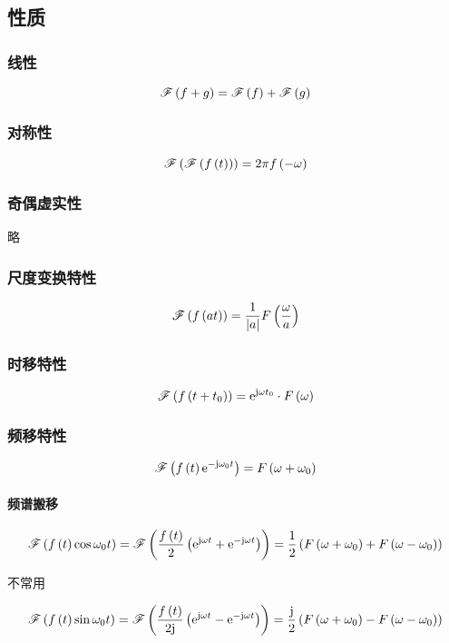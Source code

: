 \documentclass{article}
\begin{document}
\subsection{性质}

\subsubsection{线性}

\[\fourier{f+g}=\fourier f+\fourier g\]

\subsubsection{对称性}

\[\fourier{\fourier\ft}=2\pi f\pare{-\omega}\]

\subsubsection{奇偶虚实性}

略

\subsubsection{尺度变换特性}

\[\fourier{f\pare{at}}=\frac1{\abs a}F\pare{\frac\omega a}\]

\subsubsection{时移特性}

\[\fourier{f\pare{t+t_0}}=\e^{\j\omega t_0}\cdot F\pare{\omega}\]

\subsubsection{频移特性}

\[\fourier{\ft\e^{-\j\omega_0t}}=F\pare{\omega+\omega_0}\]

\paragraph{频谱搬移}

\[\fourier{\ft\cos\omega_0t}
    =\fourier{\frac\ft2\pare{\e^{\j\omega t}+\e^{-\j\omega t}}}
    =\frac12\pare{F\pare{\omega+\omega_0}+F\pare{\omega-\omega_0}}\]

不常用

\[\fourier{\ft\sin\omega_0t}
    =\fourier{\frac\ft{2\j}\pare{\e^{\j\omega t}-\e^{-\j\omega t}}}
    =\frac\j2\pare{F\pare{\omega+\omega_0}-F\pare{\omega-\omega_0}}\]
\end{document}
